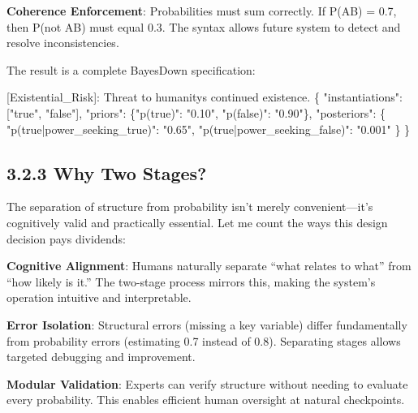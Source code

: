 \documentclass[
  11pt,
  letterpaper,
  openany]{book}
\newenvironment{Shaded}{\begin{snugshade}}{\end{snugshade}}
\newcommand{\DataTypeTok}[1]{\textcolor[rgb]{0.68,0.00,0.00}{#1}}
\newcommand{\ErrorTok}[1]{\textcolor[rgb]{0.68,0.00,0.00}{#1}}
\newcommand{\FunctionTok}[1]{\textcolor[rgb]{0.28,0.35,0.67}{#1}}
\newcommand{\OtherTok}[1]{\textcolor[rgb]{0.00,0.23,0.31}{#1}}
\newcommand{\StringTok}[1]{\textcolor[rgb]{0.13,0.47,0.30}{#1}}
\begin{document}
\textbf{Coherence Enforcement}: Probabilities must sum correctly. If
P(A\textbar B) = 0.7, then P(not A\textbar B) must equal 0.3. The syntax
allows future system to detect and resolve inconsistencies.

The result is a complete BayesDown specification:

\begin{Shaded}
\begin{Highlighting}[]
\OtherTok{[}\ErrorTok{Existential\_Risk}\OtherTok{]}\ErrorTok{:} \ErrorTok{Threat} \ErrorTok{to} \ErrorTok{humanity\textquotesingle{}s} \ErrorTok{continued} \ErrorTok{existence.} \FunctionTok{\{}
  \DataTypeTok{"instantiations"}\FunctionTok{:} \OtherTok{[}\StringTok{"true"}\OtherTok{,} \StringTok{"false"}\OtherTok{]}\FunctionTok{,}
  \DataTypeTok{"priors"}\FunctionTok{:} \FunctionTok{\{}\DataTypeTok{"p(true)"}\FunctionTok{:} \StringTok{"0.10"}\FunctionTok{,} \DataTypeTok{"p(false)"}\FunctionTok{:} \StringTok{"0.90"}\FunctionTok{\},}
  \DataTypeTok{"posteriors"}\FunctionTok{:} \FunctionTok{\{}
    \DataTypeTok{"p(true|power\_seeking\_true)"}\FunctionTok{:} \StringTok{"0.65"}\FunctionTok{,}
    \DataTypeTok{"p(true|power\_seeking\_false)"}\FunctionTok{:} \StringTok{"0.001"}
  \FunctionTok{\}}
\FunctionTok{\}}
\end{Highlighting}
\end{Shaded}

\subsection{3.2.3 Why Two Stages?}\label{sec-why-two-stages}

The separation of structure from probability isn't merely
convenient---it's cognitively valid and practically essential. Let me
count the ways this design decision pays dividends:

\textbf{Cognitive Alignment}: Humans naturally separate ``what relates
to what'' from ``how likely is it.'' The two-stage process mirrors this,
making the system's operation intuitive and interpretable.

\textbf{Error Isolation}: Structural errors (missing a key variable)
differ fundamentally from probability errors (estimating 0.7 instead of
0.8). Separating stages allows targeted debugging and improvement.

\textbf{Modular Validation}: Experts can verify structure without
needing to evaluate every probability. This enables efficient human
oversight at natural checkpoints.
\end{document}
